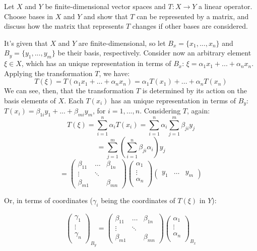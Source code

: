 \documentclass{article}
\theoremstyle{exercisestyle}
\newenvironment{exercise}[1]
  {\renewcommand\theinnerex{#1}\innerex}
  {\endinnerex}
\begin{document}
\begin{exercise}{1.1.9}
    Let $X$ and $Y$ be finite-dimensional vector spaces and $T : X \to Y$
    a linear operator. Choose bases in $X$ and $Y$ and show that $T$ can be represented
    by a matrix, and discuss how the matrix that represents $T$ changes if other bases
    are considered.

    It's given that $X$ and $Y$ are finite-dimensional, so let $B_x = \{ x_1, ..., x_n \}$ and $B_y = \{y_1, ..., y_m\}$ be their basis, respectively.
    Consider now an arbitrary element $\xi \in X$, which has an unique representation in terms of $B_x$: $\xi = \alpha_1 x_1 + ... + \alpha_n x_n$.
    Applying the transformation $T$, we have:
    $$ T(\xi) = T(\alpha_1 x_1 + ... + \alpha_n x_n) = \alpha_1 T(x_1) + ... + \alpha_n T(x_n)$$
    We can see, then, that the transformation $T$ is determined by its action on the basis elements of $X$. Each $T(x_i)$ has an unique representation in terms of $B_y$:
    $T(x_i) = \beta_{1i} y_1 + ... + \beta_{mi} y_m$, for $i = 1, ..., n$.
    Considering $T$, again:
    $$ T(\xi) = \sum_{i=1}^n \alpha_i T(x_i) = \sum_{i=1}^n \alpha_i  \sum_{j=1}^m  \beta_{ji} y_j $$
    $$ = \sum_{j=1}^m ( \sum_{i=1}^n  \beta_{ji} \alpha_i ) y_j $$
    \[ = \begin{pmatrix}
            \beta_{11} & \dots  & \beta_{1n} \\
            \vdots     & \ddots &            \\
            \beta_{m1} &        & \beta_{mn}
        \end{pmatrix}
        \begin{pmatrix}
            \alpha_{1} \\
            \vdots     \\
            \alpha_{n} \\
        \end{pmatrix}
        \begin{pmatrix}
            y_1 & \dots & y_m
        \end{pmatrix}
    \]

    Or, in terms of coordinates ($\gamma_i$ being the coordinates of $T(\xi)$ in $Y$):

    \[ \begin{pmatrix}
            \gamma_{1} \\
            \vdots     \\
            \gamma_{n} \\
        \end{pmatrix}_{B_y}
        = \begin{pmatrix}
            \beta_{11} & \dots  & \beta_{1n} \\
            \vdots     & \ddots &            \\
            \beta_{m1} &        & \beta_{mn}
        \end{pmatrix}
        \begin{pmatrix}
            \alpha_{1} \\
            \vdots     \\
            \alpha_{n} \\
        \end{pmatrix}_{B_x}
    \]


\end{exercise}
\end{document}
